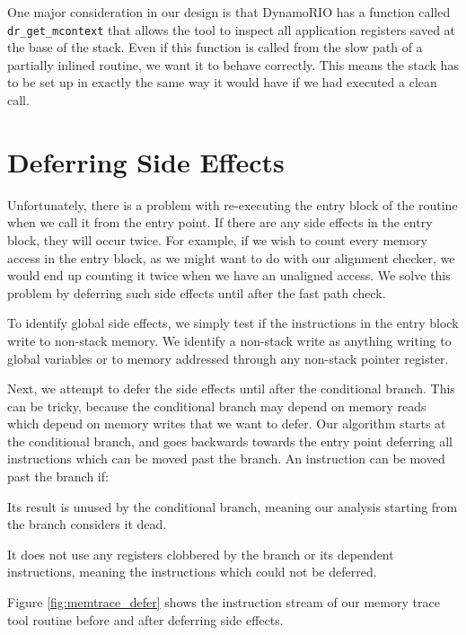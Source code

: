 One major consideration in our design is that DynamoRIO has a function called
{\tt dr\_get\_mcontext} that allows the tool to inspect all application
registers saved at the base of the stack.  Even if this function is called from
the slow path of a partially inlined routine, we want it to behave correctly.
This means the stack has to be set up in exactly the same way it would have if
we had executed a clean call.

\section{Deferring Side Effects}
\label{sec:deferring}

Unfortunately, there is a problem with re-executing the entry block of the
routine when we call it from the entry point.  If there are any side effects in
the entry block, they will occur twice.  For example, if we wish to count every
memory access in the entry block, as we might want to do with our alignment
checker, we would end up counting it twice when we have an unaligned access.  We
solve this problem by deferring such side effects until after the fast path
check.

To identify global side effects, we simply test if the instructions in the entry
block write to non-stack memory.  We identify a non-stack write as anything
writing to global variables or to memory addressed through any non-stack pointer
register.

Next, we attempt to defer the side effects until after the conditional branch.
This can be tricky, because the conditional branch may depend on memory reads
which depend on memory writes that we want to defer.  Our algorithm starts at
the conditional branch, and goes backwards towards the entry point deferring all
instructions which can be moved past the branch.  An instruction can be moved
past the branch if:

\begin{packed_enumerate}
\item Its result is unused by the conditional branch, meaning our analysis
starting from the branch considers it dead.
\item It does not use any registers clobbered by the branch or its dependent
instructions, meaning the instructions which could not be deferred.
\end{packed_enumerate}

Figure \ref{fig:memtrace_defer} shows the instruction stream of our memory trace
tool routine before and after deferring side effects.

